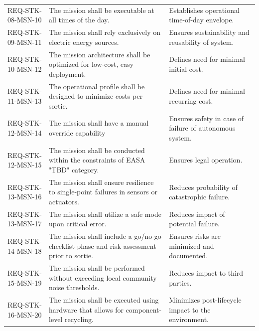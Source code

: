 \begin{xltabular}{\textwidth}{p{0.12\textwidth} X X}
REQ-STK-08-MSN-10 & The mission shall be executable at all times of the day.                                                         & Establishes operational time-of-day envelope.                               \\
REQ-STK-09-MSN-11 & The mission shall rely exclusively on electric energy sources.                                                   & Ensures sustainability and reusability of system.                           \\
REQ-STK-10-MSN-12 & The mission architecture shall be optimized for low-cost, easy deployment.                                       & Defines need for minimal initial cost.                                      \\
REQ-STK-11-MSN-13 & The operational profile shall be designed to minimize costs per sortie.                                          & Defines need for minimal recurring cost.                                    \\
REQ-STK-12-MSN-14 & The mission shall have a manual override capability                                                                       & Ensures safety in case of failure of autonomous system.                     \\
REQ-STK-12-MSN-15 & The mission shall be conducted within the constraints of EASA "TBD" category.                                    & Ensures legal operation.                                                    \\
REQ-STK-13-MSN-16 & The mission shall ensure resilience to single-point failures in sensors or actuators.                            & Reduces probability of catastrophic failure.                                \\
REQ-STK-13-MSN-17 & The mission shall utilize a safe mode upon critical error.                                                       & Reduces impact of potential failure.                                        \\
REQ-STK-14-MSN-18 & The mission shall include a go/no-go checklist phase and risk assessment prior to sortie.                        & Ensures risks are minimized and documented.                                 \\
REQ-STK-15-MSN-19 & The mission shall be performed without exceeding local community noise thresholds.                               & Reduces impact to third parties.                                            \\
REQ-STK-16-MSN-20 & The mission shall be executed using hardware that allows for component-level recycling.                          & Minimizes post-lifecycle impact to the environment.                         \\

\end{xltabular}
